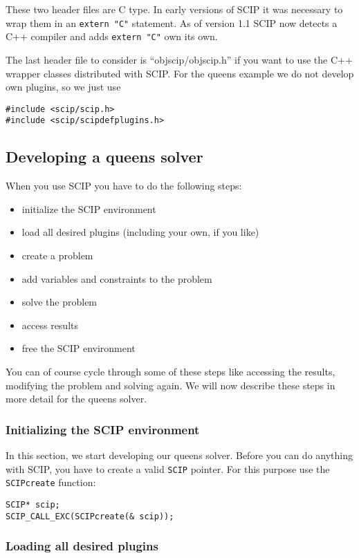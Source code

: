 \documentclass[a4paper]{article}
\begin{document}
These two header files are C type. In early versions of SCIP it was necessary to wrap them in an \verb+extern "C"+
statement. As of version 1.1 SCIP now detects a C++ compiler and adds \verb+extern "C"+ own its own. 

The last header file to consider is ``objscip/objscip.h'' if you want to use the C++ wrapper classes distributed  with
SCIP. For the queens example we do not develop own plugins, so we just use
\begin{verbatim}
#include <scip/scip.h>
#include <scip/scipdefplugins.h>
\end{verbatim}

\subsection{Developing a queens solver}

When you use SCIP you have to do the following steps:
\begin{itemize}
\item initialize the SCIP environment
\item load all desired plugins (including your own, if you like)
\item create a problem
\item add variables and constraints to the problem
\item solve the problem
\item access results
\item free the SCIP environment
\end{itemize}
You can of course cycle through some of these steps like accessing the results, modifying the problem and 
solving again. We will now describe these steps in more detail for the queens solver.

\subsubsection{Initializing the SCIP environment}

In this section, we start developing our queens solver. Before you can do anything with SCIP, you have to 
create a valid \verb+SCIP+ pointer. For this purpose use the \verb+SCIPcreate+ function:
\begin{verbatim}
SCIP* scip;
SCIP_CALL_EXC(SCIPcreate(& scip));
\end{verbatim}

\subsubsection{Loading all desired plugins}
\end{document}

